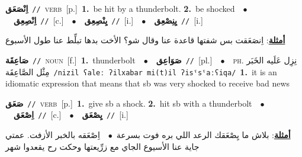\documentclass[10pt,a4paper,twoside]{article} %
\begin{document}
\begin{multicols}{2}
{\setlength\topsep{0pt}\textbf{\foreignlanguage{arabic}{اِنْصَعَق}}\ {\color{gray}\texttt{//}\color{black}}\ \textsc{verb}\ [p.]\ \textbf{1.}~be hit by a thunderbolt.  \textbf{2.}~be shocked\ \ $\bullet$\ \ \setlength\topsep{0pt}\textbf{\foreignlanguage{arabic}{اِنْصِعِق}}\ {\color{gray}\texttt{//}\color{black}}\ [c.]\ \ $\bullet$\ \ \setlength\topsep{0pt}\textbf{\foreignlanguage{arabic}{يِنْصِعِق}}\ {\color{gray}\texttt{//}\color{black}}\ [i.]\ \ $\bullet$\ \ \setlength\topsep{0pt}\textbf{\foreignlanguage{arabic}{يِنِصْعِق}}\ {\color{gray}\texttt{//}\color{black}}\ [i.]\  \begin{flushright}\color{gray}\foreignlanguage{arabic}{\textbf{\underline{\foreignlanguage{arabic}{أمثلة}}}: اِنصَعَقت بس شفتها قاعدة عنا وقال شو؟ الأخت بدها تبلِّط عنا طول الأسبوع}\end{flushright}\color{black}} \vspace{2mm}

{\setlength\topsep{0pt}\textbf{\foreignlanguage{arabic}{صَاعِقَة}}\ {\color{gray}\texttt{//}\color{black}}\ \textsc{noun}\ [f.]\ \textbf{1.}~thunderbolt\ \ $\bullet$\ \ \setlength\topsep{0pt}\textbf{\foreignlanguage{arabic}{صَوَاعِق}}\ {\color{gray}\texttt{//}\color{black}}\ [pl.]\ \ $\bullet$\ \ \textsc{ph.} \color{gray} \foreignlanguage{arabic}{نِزِل عَلَيه الخَبَر مِثْل الصَّاعِقَة}\color{black}\ {\color{gray}\texttt{/{\sffamily nizil ʕaleː ʔilxabar mi(t)il ʔisˤsˤaːʕiqa}/}\color{black}}\ \textbf{1.}~it is an idiomatic expression that means that sb was very shocked to receive bad news\ } \vspace{2mm}

{\setlength\topsep{0pt}\textbf{\foreignlanguage{arabic}{صَعَق}}\ {\color{gray}\texttt{//}\color{black}}\ \textsc{verb}\ [p.]\ \textbf{1.}~give sb a shock.  \textbf{2.}~hit sb with a thunderbolt\ \ $\bullet$\ \ \setlength\topsep{0pt}\textbf{\foreignlanguage{arabic}{اِصْعَق}}\ {\color{gray}\texttt{//}\color{black}}\ [c.]\ \ $\bullet$\ \ \setlength\topsep{0pt}\textbf{\foreignlanguage{arabic}{يِصْعَق}}\ {\color{gray}\texttt{//}\color{black}}\ [i.]\  \begin{flushright}\color{gray}\foreignlanguage{arabic}{\textbf{\underline{\foreignlanguage{arabic}{أمثلة}}}: بلاش ما يِصْعَقك الرعد اللي بره فوت بسرعة\ $\bullet$\ \  اِصْعَقه بالخبر الأزفت. عمتي جاية عنا الأسيوع الجاي مع زرِّيعتها وحكت رح يقعدوا شهر}\end{flushright}\color{black}} \vspace{2mm}


\end{multicols}
\end{document}
